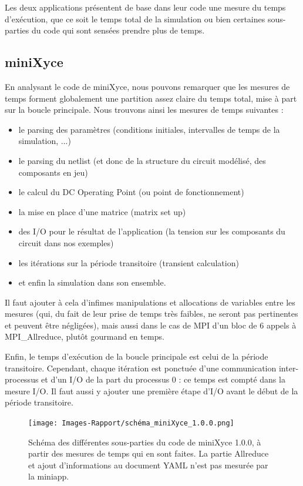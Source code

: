 \documentclass[11pt,a4paper,oneside]{memoir}
\theoremstyle{definition}
\theoremstyle{remark}
\theoremstyle{plain}
\begin{document}
Les deux applications présentent de base dans leur code une mesure du temps d'exécution, que ce soit le temps total de la simulation ou bien certaines sous-parties du code qui sont sensées prendre plus de temps.


\subsection{miniXyce}

En analysant le code de miniXyce, nous pouvons remarquer que les mesures de temps forment globalement une partition assez claire du temps total, mise à part sur la boucle principale. Nous trouvons ainsi les mesures de temps suivantes :
\begin{itemize}
\item le parsing des paramètres (conditions initiales, intervalles de temps de la simulation, ...)
\item le parsing du netlist (et donc de la structure du circuit modélisé, des composants en jeu)
\item le calcul du DC Operating Point (ou point de fonctionnement)
\item la mise en place d'une matrice (matrix set up)
\item des I/O pour le résultat de l'application (la tension sur les composants du circuit dans nos exemples)
\item les itérations sur la période transitoire (transient calculation)
\item et enfin la simulation dans son ensemble.
\end{itemize}

Il faut ajouter à cela d'infimes manipulations et allocations de variables entre les mesures (qui, du fait de leur prise de temps très faibles, ne seront pas pertinentes et peuvent être négligées), mais aussi dans le cas de MPI d'un bloc de 6 appels à MPI\_Allreduce, plutôt gourmand en temps.

Enfin, le temps d'exécution de la boucle principale est celui de la période transitoire. Cependant, chaque itération est ponctuée d'une communication inter-processus et d'un I/O de la part du processus 0 : ce temps est compté dans la mesure I/O. Il faut aussi y ajouter une première étape d'I/O avant le début de la période transitoire.

\begin{figure}[!ht]
\begin{center}
\texttt{[image: Images-Rapport/schéma\_miniXyce\_1.0.0.png]}
\caption{Schéma des différentes sous-parties du code de miniXyce 1.0.0, à partir des mesures de temps qui en sont faites. La partie Allreduce et ajout d'informations au document YAML n'est pas mesurée par la miniapp.}
\label{schéma_miniXyce_1.0.0}
\end{center}
\end{figure}
\end{document}
